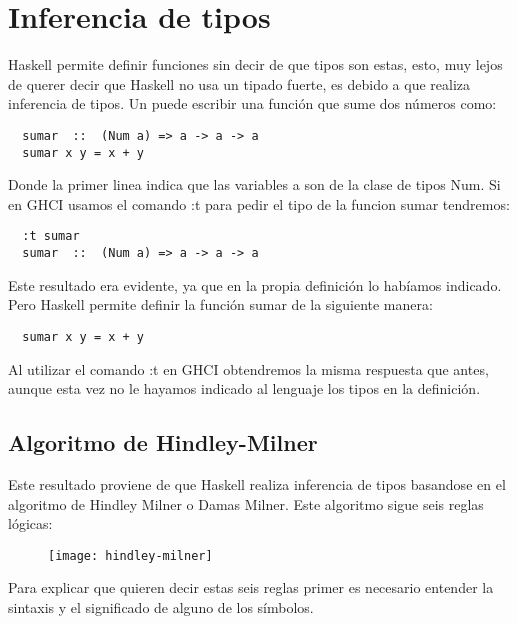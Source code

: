 \section{Inferencia de tipos} %
\label{sec:inferencia_de_tipos}


Haskell permite definir funciones sin decir de que tipos son estas, esto, muy lejos de querer decir que Haskell no usa un tipado fuerte, es debido a que realiza inferencia de tipos.
Un puede escribir una función que sume dos números como:


\begin{lstlisting}
  sumar  ::  (Num a) => a -> a -> a
  sumar x y = x + y
\end{lstlisting}

Donde la primer linea indica que las variables a son de la clase de tipos Num.
Si en GHCI usamos el comando :t para pedir el tipo de la funcion sumar tendremos:


\begin{lstlisting}
  :t sumar
  sumar  ::  (Num a) => a -> a -> a
\end{lstlisting}

Este resultado era evidente, ya que en la propia definición lo habíamos indicado. Pero Haskell permite definir la función sumar de la siguiente manera:

\begin{lstlisting}
  sumar x y = x + y
\end{lstlisting}

Al utilizar el comando :t en GHCI obtendremos la misma respuesta que antes, aunque esta vez no le  hayamos indicado al lenguaje los tipos en la definición.

\subsection{Algoritmo de Hindley-Milner} %

Este resultado proviene de que Haskell realiza inferencia de tipos basandose en el algoritmo de Hindley Milner o Damas Milner.
Este algoritmo sigue seis reglas lógicas:
\begin{figure}[H]
\texttt{[image: hindley-milner]}
\end{figure}

Para explicar que quieren decir estas seis reglas primer es necesario entender la sintaxis y el significado de alguno de los símbolos.

